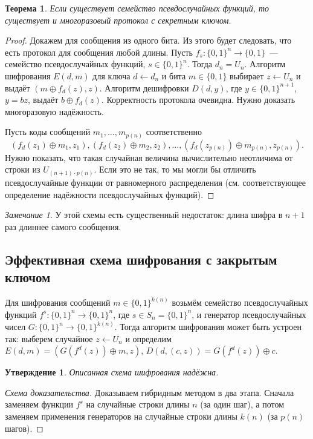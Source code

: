 \documentclass[12pt,a4paper]{article}
\newcommand{\bits}{\{0,1\}}
\theoremstyle{definition}
\theoremstyle{plain}
\newtheorem{theorem}{Теорема}[section]
\newtheorem{statement}{Утверждение}[section]
\theoremstyle{remark}
\newtheorem{remark}{Замечание}[section]
\begin{document}
\begin{theorem}
Если существует семейство псевдослучайных функций, то существует и многоразовый протокол с секретным ключом.
\end{theorem}
\begin{proof}
Докажем для сообщения из одного бита. Из этого будет следовать, что есть протокол для сообщения любой длины.
Пусть $f_s:\bits^n\to\bits$~--- семейство псевдослучайных функций, $s\in\bits^n$. Тогда $d_n = U_n$.  Алгоритм шифрования $E(d,m)$ для ключа $d\gets d_n$ и бита $m\in\bits$ выбирает $z\gets U_n$ и выдаёт $(m\oplus f_{d}(z),z)$. Алгоритм дешифровки $D(d, y)$, где $y\in\bits^{n+1}$, $y=bz$, выдаёт $b\oplus f_{d}(z)$. Корректность
протокола очевидна. Нужно доказать многоразовую надёжность.

Пусть коды сообщений $m_1,\dotsc,m_{p(n)}$ соответственно
$$(f_{d}(z_1)\oplus m_1,z_1),(f_{d}(z_2)\oplus m_2,z_2),\dotsc,(f_{d}(z_{p(n)})\oplus m_{p(n)},z_{p(n)}).$$
Нужно показать, что такая случайная величина вычислительно неотличима
от строки из $U_{(n+1)\cdot p(n)}$. Если это не так, то 
мы могли бы отличить псевдослучайные функции от равномерного распределения (см. соответствующее определение надёжности
псевдослучайных функций).
\end{proof}
\begin{remark}
У этой схемы есть существенный недостаток: длина шифра в $n+1$ раз
длиннее самого сообщения.
\end{remark}
\subsection{Эффективная схема шифрования с закрытым ключом}
Для шифрования сообщений $m\in\bits^{k(n)}$ возьмём семейство псевдослучайных
функций $f^{s}: \bits^n\to\bits^{n}$, где $s\in S_n = \bits^n$, и генератор псевдослучайных чисел $G:\bits^n\to\bits^{k(n)}$. 
Тогда алгоритм шифрования
может быть устроен так: выберем случайное $z\gets U_{n}$ и 
определим $E(d, m) = (G(f^{d}(z))\oplus m, z)$,
$D(d, (c,z)) = G(f^{d}(z))\oplus c$.
\begin{statement}
Описанная схема шифрования надёжна.
\end{statement}
\begin{proof}[Схема доказательства]
Доказываем гибридным методом в два этапа. 
Сначала заменяем функции $f^s$ на случайные строки длины $n$ (за один шаг), а потом заменяем применения генераторов на случайные строки длины $k(n)$ (за $p(n)$ шагов). 
\end{proof}
\end{document}
